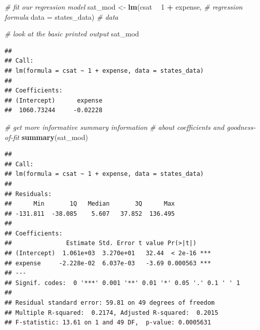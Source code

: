 \documentclass[]{book}
\newenvironment{Shaded}{\begin{snugshade}}{\end{snugshade}}
\newcommand{\CommentTok}[1]{\textcolor[rgb]{0.56,0.35,0.01}{\textit{#1}}}
\newcommand{\DataTypeTok}[1]{\textcolor[rgb]{0.13,0.29,0.53}{#1}}
\newcommand{\DecValTok}[1]{\textcolor[rgb]{0.00,0.00,0.81}{#1}}
\newcommand{\KeywordTok}[1]{\textcolor[rgb]{0.13,0.29,0.53}{\textbf{#1}}}
\newcommand{\NormalTok}[1]{#1}
\newcommand{\OperatorTok}[1]{\textcolor[rgb]{0.81,0.36,0.00}{\textbf{#1}}}
\newcommand{\StringTok}[1]{\textcolor[rgb]{0.31,0.60,0.02}{#1}}
\begin{document}
\begin{Shaded}
\begin{Highlighting}[]
  \CommentTok{# fit our regression model}
\NormalTok{  sat_mod <-}\StringTok{ }\KeywordTok{lm}\NormalTok{(csat }\OperatorTok{~}\StringTok{ }\DecValTok{1} \OperatorTok{+}\StringTok{ }\NormalTok{expense, }\CommentTok{# regression formula}
                \DataTypeTok{data =}\NormalTok{ states_data) }\CommentTok{# data }

  \CommentTok{# look at the basic printed output}
\NormalTok{  sat_mod}
\end{Highlighting}
\end{Shaded}

\begin{verbatim}
## 
## Call:
## lm(formula = csat ~ 1 + expense, data = states_data)
## 
## Coefficients:
## (Intercept)      expense  
##  1060.73244     -0.02228
\end{verbatim}

\begin{Shaded}
\begin{Highlighting}[]
  \CommentTok{# get more informative summary information }
  \CommentTok{# about coefficients and goodness-of-fit}
  \KeywordTok{summary}\NormalTok{(sat_mod)}
\end{Highlighting}
\end{Shaded}

\begin{verbatim}
## 
## Call:
## lm(formula = csat ~ 1 + expense, data = states_data)
## 
## Residuals:
##      Min       1Q   Median       3Q      Max 
## -131.811  -38.085    5.607   37.852  136.495 
## 
## Coefficients:
##               Estimate Std. Error t value Pr(>|t|)    
## (Intercept)  1.061e+03  3.270e+01   32.44  < 2e-16 ***
## expense     -2.228e-02  6.037e-03   -3.69 0.000563 ***
## ---
## Signif. codes:  0 '***' 0.001 '**' 0.01 '*' 0.05 '.' 0.1 ' ' 1
## 
## Residual standard error: 59.81 on 49 degrees of freedom
## Multiple R-squared:  0.2174, Adjusted R-squared:  0.2015 
## F-statistic: 13.61 on 1 and 49 DF,  p-value: 0.0005631
\end{verbatim}

\begin{Shaded}
\end{Shaded}
\end{document}
